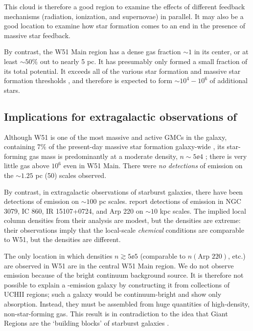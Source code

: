 This cloud is therefore a good region to examine the effects of different
feedback mechanisms (radiation, ionization, and supernovae) in parallel.  It
may also be a good location to examine how star formation comes to an end in
the presence of massive star feedback.

By contrast, the W51 Main region has a dense gas fraction $\sim1$ in its
center, or at least $\sim50\%$ out to nearly 5 pc.  It has presumably only
formed a small fraction
of its total potential.  It exceeds all of the various star formation and
massive star formation thresholds
\citep[e.g.][]{Lada2010a,Krumholz2008a,Kauffmann2010a}, and therefore is expected
to form $\sim10^4-10^6$ \msun of additional stars.

\subsection{Implications for extragalactic observations of \formaldehyde}
\label{sec:exgal}
Although W51 is one of the most massive and active GMCs in the galaxy,
containing 7\% of the present-day massive star formation galaxy-wide
\citep{Urquhart2014a}, its star-forming gas mass is predominantly at a moderate
density, $n\sim5\ee{4}$ \percc; there is very little gas above $10^6$ \percc even
in W51 Main.  There were \emph{no detections} of \formaldehyde emission on the
$\sim1.25$ pc (50\arcsec) scales observed.

By contrast, in extragalactic observations of starburst galaxies, there have
been detections of \formaldehyde emission on $\sim100$ pc scales.
\citet{Mangum2013a} report
detections of \formaldehyde \oneone emission in NGC 3079, IC 860, IR
15107+0724, and Arp 220 on $\sim10$ kpc scales.  The implied local column
densities from their analysis are modest, but the densities are extreme: their
observations imply that the local-scale \emph{chemical} conditions are
comparable to W51, but the densities are different.

The only location in which densities $n\gtrsim5\ee{5}$ \percc (comparable to
$n(\textrm{Arp } 220)$, etc.) are observed in W51 are in the central W51
Main region.  We do not observe emission because of the bright
continuum background source.  It is therefore not possible to explain a
\formaldehyde-emission galaxy by constructing it from collections of UCHII
regions; such a galaxy would be continuum-bright and show only \formaldehyde
absorption.  Instead, they must be assembled from huge quantities of
high-density, non-star-forming gas.  This result is in contradiction to the
idea that Giant \hii Regions are the `building blocks' of starburst galaxies
\citep[e.g.][]{Miura2014a}.

